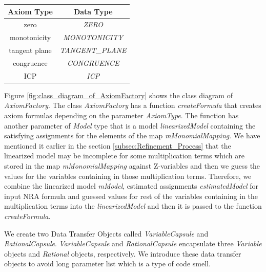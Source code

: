 \begin{table}[!ht]
\label{table:axiomType}
\centering
\begin{tabular}{|c|c|}
\hline
Axiom Type    & Data Type                                \\ \hline
zero          & \textit{ZERO}           \\ \hline
monotonicity  & \textit{MONOTONICITY}   \\ \hline
tangent plane & \textit{TANGENT\_PLANE} \\ \hline
congruence    & \textit{CONGRUENCE}     \\ \hline
ICP           & \textit{ICP}            \\ \hline
\end{tabular}
\end{table}

\noindent Figure \ref{fig:class_diagram_of_AxiomFactory} shows the class diagram of \textit{AxiomFactory}.
The class \textit{AxiomFactory} has a function \textit{createFormula} that creates axiom formulas depending on the parameter \textit{AxiomType}.
The function has another parameter of \textit{Model} type that is a model \textit{linearizedModel} containing the satisfying assignments for the elements of the map \textit{mMonomialMapping}.
We have mentioned it earlier in the section \ref{subsec:Refinement_Process} that the linearized model may be incomplete for some multiplication terms which are stored in the map \textit{mMonomialMapping} against Z-variables and then we guess the values for the variables containing in those multiplication terms.
Therefore, we combine the linearized model \textit{mModel}, estimated assignments \textit{estimatedModel} for input NRA formula and guessed values for rest of the variables containing in the multiplication terms into the \textit{linearizedModel} and then it is passed to the function \textit{createFormula}.\newline

\noindent We create two Data Transfer Objects called \textit{VariableCapsule} and \textit{RationalCapsule}.
\textit{VariableCapsule} and \textit{RationalCapsule} encapsulate three \textit{Variable} objects and \textit{Rational} objects, respectively.
We introduce these data transfer objects to avoid long parameter list which is a type of code smell.\newline

